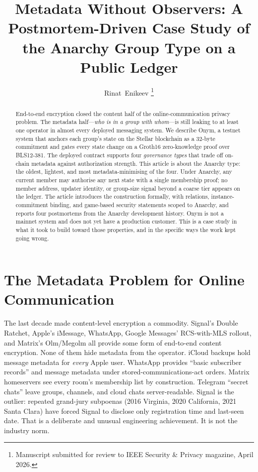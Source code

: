 \documentclass[journal]{IEEEtran}
\begin{document}
\title{Metadata Without Observers: A Postmortem-Driven Case Study of the Anarchy Group Type on a Public Ledger}

\author{Rinat~Enikeev%
\thanks{Manuscript submitted for review to IEEE Security \& Privacy magazine, April 2026.}%
}


\maketitle

\begin{abstract}
End-to-end encryption closed the content half of the online-communication privacy problem. The metadata half---\emph{who is in a group with whom}---is still leaking to at least one operator in almost every deployed messaging system. We describe Onym, a testnet system that anchors each group's state on the Stellar blockchain as a 32-byte commitment and gates every state change on a Groth16 zero-knowledge proof over BLS12-381. The deployed contract supports four \emph{governance types} that trade off on-chain metadata against authorization strength. This article is about the Anarchy type: the oldest, lightest, and most metadata-minimising of the four. Under Anarchy, any current member may authorise any next state with a single membership proof; no member address, updater identity, or group-size signal beyond a coarse tier appears on the ledger. The article introduces the construction formally, with relations, instance-commitment binding, and game-based security statements scoped to Anarchy, and reports four postmortems from the Anarchy development history. Onym is not a mainnet system and does not yet have a production customer. This is a case study in what it took to build toward those properties, and in the specific ways the work kept going wrong.
\end{abstract}

\section{The Metadata Problem for Online Communication}

The last decade made content-level encryption a commodity. Signal's Double Ratchet, Apple's iMessage, WhatsApp, Google Messages' RCS-with-MLS rollout, and Matrix's Olm/Megolm all provide some form of end-to-end content encryption. None of them hide metadata from the operator. iCloud backups hold message metadata for \emph{every} Apple user. WhatsApp provides ``basic subscriber records'' and message metadata under stored-communications-act orders. Matrix homeservers see every room's membership list by construction. Telegram ``secret chats'' leave groups, channels, and cloud chats server-readable. Signal is the outlier: repeated grand-jury subpoenas (2016 Virginia, 2020 California, 2021 Santa Clara) have forced Signal to disclose only registration time and last-seen date. That is a deliberate and unusual engineering achievement. It is not the industry norm.
\end{document}
